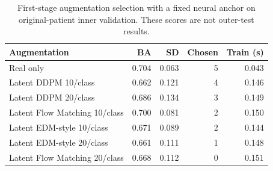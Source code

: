 \begin{table}[t]
\centering
\caption{First-stage augmentation selection with a fixed neural anchor on original-patient inner validation. These scores are not outer-test results.}
\label{tab:augmentation_first}
\footnotesize
\setlength{\tabcolsep}{4pt}
\begin{tabular}{lrrrr}
\toprule
Augmentation & BA & SD & Chosen & Train (s) \\
\midrule
Real only & 0.704 & 0.063 & 5 & 0.043 \\
Latent DDPM 10/class & 0.662 & 0.121 & 4 & 0.146 \\
Latent DDPM 20/class & 0.686 & 0.134 & 3 & 0.149 \\
Latent Flow Matching 10/class & 0.700 & 0.081 & 2 & 0.150 \\
Latent EDM-style 10/class & 0.671 & 0.089 & 2 & 0.144 \\
Latent EDM-style 20/class & 0.661 & 0.111 & 1 & 0.148 \\
Latent Flow Matching 20/class & 0.668 & 0.112 & 0 & 0.151 \\
\bottomrule
\end{tabular}
\end{table}
